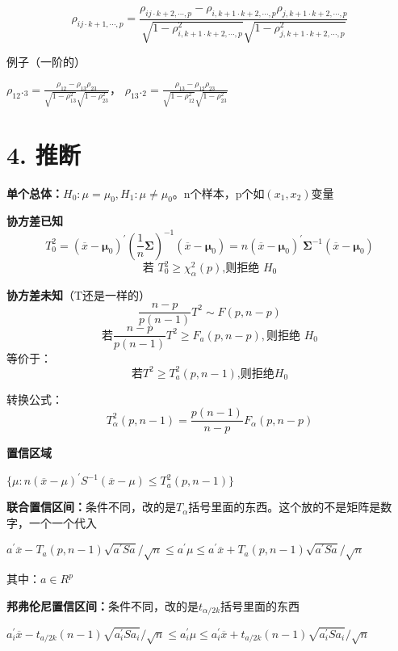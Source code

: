 \documentclass[10pt,a4paper]{ctexart} %
\begin{document}
\begin{multicols*}{3}
		$$\rho_{ij\cdot k+1,\cdots,p}=\frac{\rho_{ij\cdot k+2,\cdots,p}-\rho_{i,k+1\cdot k+2,\cdots,p}\rho_{j,k+1\cdot k+2,\cdots,p}}{\sqrt{1-\rho_{i,k+1\cdot k+2,\cdots,p}^{2}}\sqrt{1-\rho^2_{j,k+1\cdot k+2,\cdots,p}}}$$
		
		例子（一阶的）
		
		$\rho_{12}._{3}=\frac{\rho_{12}-\rho_{13}\rho_{23}}{\sqrt{1-\rho_{13}^{2}}\sqrt{1-\rho_{23}^{2}}}$，
		$\rho_{13}._{2}=\frac{\rho_{13}-\rho_{12}\rho_{23}}{\sqrt{1-\rho_{12}^{2}}\sqrt{1-\rho_{23}^{2}}}$
		
		
		
		\section*{\centering \normalsize 4. 推断}
		\textbf{单个总体：}$H_0:\mu=\mu_0, H_1:\mu \neq \mu_0$。n个样本，p个如$(x_1,x_2)$变量
		
		\textbf{协方差已知}
		$$T_0^2=(\overline{x}-\boldsymbol{\mu}_0)^{\prime}\left(\frac{1}{n}\boldsymbol{\Sigma}\right)^{-1}(\overline{x}-\boldsymbol{\mu}_0)=n(\overline{x}-\boldsymbol{\mu}_0)^{\prime}\boldsymbol{\Sigma}^{-1}(\overline{x}-\boldsymbol{\mu}_0)$$
		$$\text{若 }T_0^2\geqslant\chi_\alpha^2(p)\text{,则拒绝 }H_0$$
		
		\textbf{协方差未知}（T还是一样的）
		$$\frac{n-p}{p\left(n-1\right)}T^{2}\sim F\left(p,n-p\right)$$
		$$\text{若}\frac{n-p}{p(n-1)}T^2\geqslant F_a(p,n-p),\text{则拒绝 }H_0$$
		等价于：
		$$\text{若}T^{2}\geqslant T_{a}^{2}\left(p,n-1\right)\text{,则拒绝}H_{0}$$
		
		转换公式：
		$$T_{\alpha}^{2}\left(p,n-1\right)=\frac{p\left(n-1\right)}{n-p}F_{\alpha}\left(p,n-p\right)$$
		
		\textbf{置信区域}
		
		$\{\mu:n(\overline{x}-\mu)^{\prime}S^{-1}(\overline{x}-\mu)\leqslant T_{a}^{2}(p,n-1)\}$
		
		\textbf{联合置信区间：}条件不同，改的是$T_{\alpha}$括号里面的东西。这个放的不是矩阵是数字，一个一个代入
		
		$a^{\prime}\overline{x}-T_{a}\left(p,n-1\right)\sqrt{a^{\prime}Sa}/\sqrt{n}\leqslant a^{\prime}\mu\leqslant a^{\prime}\overline{x}+T_{a}\left(p,n-1\right)\sqrt{a^{\prime}Sa}/\sqrt{n}$
		
		其中：$a \in R^p$
		
		\textbf{邦弗伦尼置信区间：}条件不同，改的是$t_{\alpha / 2k}$括号里面的东西
		
		$a_i^{\prime}\overline{x}-t_{a/2k}(n-1)\sqrt{a_i^{\prime}Sa_i}/\sqrt{n}\leqslant a_i^{\prime}\mu\leqslant a_i^{\prime}\overline{x}+t_{a/2k}(n-1)\sqrt{a_i^{\prime}Sa_i}/\sqrt{n}$
		

\end{multicols*}
\end{document}
